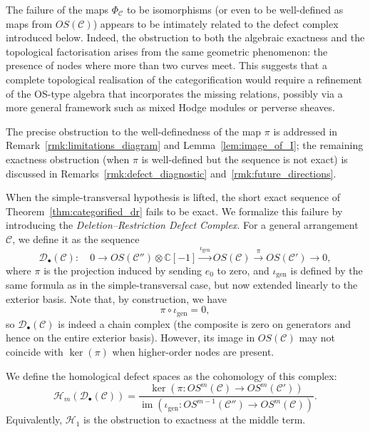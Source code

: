 \documentclass[article,11pt]{amsart} \numberwithin{equation}{section}
\numberwithin{equation}{section}
\begin{document}
{\begin{rk}\label{rmk:defect_complex}
	The failure of the maps $\Phi_{\mathcal C}$ to be isomorphisms (or even
	to be well-defined as maps from $OS(\mathcal C)$) appears to be intimately
	related to the defect complex introduced below. Indeed, the
	obstruction to both the algebraic exactness and the topological
	factorisation arises from the same geometric phenomenon: the presence
	of nodes where more than two curves meet. This suggests that a complete
	topological realisation of the categorification would require a refinement
	of the OS-type algebra that incorporates the missing relations, possibly
	via a more general framework such as mixed Hodge modules or perverse sheaves.
	
	The precise obstruction to the well-definedness of the map $\pi$ is
	addressed in Remark~\ref{rmk:limitations_diagram} and
	Lemma~\ref{lem:image_of_I}; the remaining exactness obstruction
	(when $\pi$ is well-defined but the sequence is not exact) is
	discussed in Remarks~\ref{rmk:defect_diagnostic}
	and~\ref{rmk:future_directions}.
\end{rk}

When the simple-transversal hypothesis is lifted, the short exact 
sequence of Theorem~\ref{thm:categorified_dr} fails to be exact. We 
formalize this failure by introducing the \emph{Deletion–Restriction 
	Defect Complex}. For a general arrangement $\mathcal C$, we define it
as the sequence
\[
\mathcal D_\bullet(\mathcal C): \quad 
0 \longrightarrow OS(\mathcal C'') \otimes \mathbb{C}[-1] 
\xrightarrow{\iota_{\text{gen}}} OS(\mathcal C) 
\xrightarrow{\pi} OS(\mathcal C') 
\longrightarrow 0,
\]
where $\pi$ is the projection induced by sending $e_0$ to zero, and
$\iota_{\text{gen}}$ is defined by the same formula as in the
simple-transversal case, but now extended linearly to the exterior
basis. Note that, by construction, we have
\[
\pi \circ \iota_{\text{gen}} = 0,
\]
so $\mathcal D_\bullet(\mathcal C)$ is indeed a chain complex (the
composite is zero on generators and hence on the entire exterior basis).
However, its image in $OS(\mathcal C)$ may not coincide with
$\ker(\pi)$ when higher-order nodes are present.

We define the homological defect spaces as the cohomology of this complex:
\[
\mathcal H_m(\mathcal D_\bullet(\mathcal C)) 
= \frac{\ker(\pi : OS^m(\mathcal C) \longrightarrow OS^m(\mathcal C'))}
{\operatorname{im}(\iota_{\text{gen}} : OS^{m-1}(\mathcal C'') \longrightarrow OS^m(\mathcal C))}.
\]
Equivalently, $\mathcal H_1$ is the obstruction to exactness at the middle term.

}
\end{document}
